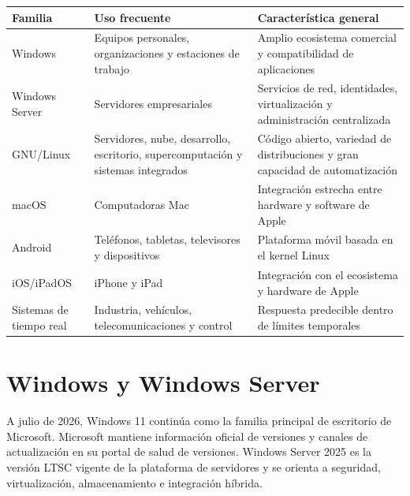 \documentclass[
  spanish,
  letterpaper,
]{scrbook}
\newcounter{none} %
\begin{document}
{\def\LTcaptype{none} %
\begin{longtable}[]{@{}
  >{\raggedright\arraybackslash}p{}
  >{\raggedright\arraybackslash}p{}
  >{\raggedright\arraybackslash}p{}@{}}
\toprule\noalign{}
\begin{minipage}[b]{\linewidth}\raggedright
Familia
\end{minipage} & \begin{minipage}[b]{\linewidth}\raggedright
Uso frecuente
\end{minipage} & \begin{minipage}[b]{\linewidth}\raggedright
Característica general
\end{minipage} \\
\midrule\noalign{}
\endhead
\bottomrule\noalign{}
\endlastfoot
Windows & Equipos personales, organizaciones y estaciones de trabajo &
Amplio ecosistema comercial y compatibilidad de aplicaciones \\
Windows Server & Servidores empresariales & Servicios de red,
identidades, virtualización y administración centralizada \\
GNU/Linux & Servidores, nube, desarrollo, escritorio, supercomputación y
sistemas integrados & Código abierto, variedad de distribuciones y gran
capacidad de automatización \\
macOS & Computadoras Mac & Integración estrecha entre hardware y
software de Apple \\
Android & Teléfonos, tabletas, televisores y dispositivos & Plataforma
móvil basada en el kernel Linux \\
iOS/iPadOS & iPhone y iPad & Integración con el ecosistema y hardware de
Apple \\
Sistemas de tiempo real & Industria, vehículos, telecomunicaciones y
control & Respuesta predecible dentro de límites temporales \\
\end{longtable}
}

\section{Windows y Windows Server}\label{windows-y-windows-server}

A julio de 2026, Windows 11 continúa como la familia principal de
escritorio de Microsoft. Microsoft mantiene información oficial de
versiones y canales de actualización en su portal de salud de versiones.
Windows Server 2025 es la versión LTSC vigente de la plataforma de
servidores y se orienta a seguridad, virtualización, almacenamiento e
integración híbrida.
\end{document}
